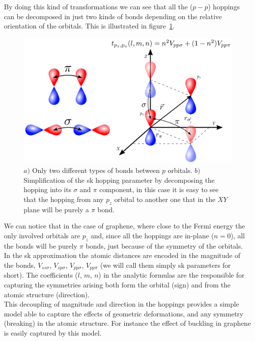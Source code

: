 By doing this kind of transformations we can see that all the ($p-p$) hoppings can be decomposed in just two kinds of bonds depending on the relative orientation of the orbitals. This is illustrated in figure~\ref{bonds}.
\begin{figure}[h!]
\centering
\includegraphics{chapter04/figures/bonds.png}
\vspace{-5pt}
\caption{$a)$ Only two different types of bonds between $p$ orbitals. $b)$ Simplification of the \ac{sk} hopping parameter by decomposing the hopping into its $\sigma$ and $\pi$ component, in this case it is easy to see that the hopping from any $p_{z}$ orbital to another one that in the $XY$ plane will be purely a $\pi$ bond.}
\label{bonds}
\end{figure}
\FloatBarrier
We can notice that in the case of graphene, where close to the Fermi energy the only involved orbitals are $p_{z}$ and, since all the hoppings are in-plane ($n=0$), all the bonds will be purely $\pi$ bonds, just because of the symmetry of the orbitals.\\


In the \ac{sk} approximation the atomic distances are encoded in the magnitude of the bonds, $V_{ss\sigma}$, $V_{sp\sigma}$, $V_{pp\sigma}$, $V_{pp\pi}$ (we will call them simply \ac{sk} parameters for short). The coefficients ($l$, $m$, $n$) in the analytic formulas are the responsible for capturing the symmetries arising both form the orbital (sign) and from the atomic structure (direction).\\

This decoupling of magnitude and direction in the hoppings provides a simple model able to capture the effects of geometric deformations, and any symmetry (breaking) in the atomic structure. For instance the effect of buckling in graphene is easily captured by this model.

